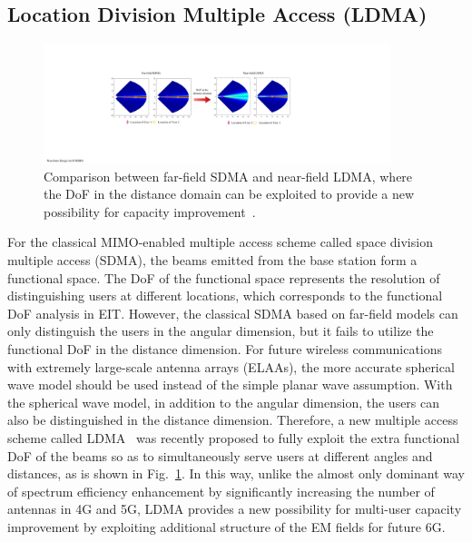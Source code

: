\documentclass[journal,twocolumn]{IEEEtran}
\begin{document}

\subsection{Location Division Multiple Access (LDMA)}
\begin{figure}[t]
	\centering 
	\includegraphics[width=0.9\textwidth]{figures/LDMA.pdf} 
	\caption{Comparison between far-field SDMA and near-field LDMA, where the DoF in the distance domain can be exploited to provide a new possibility for capacity improvement~\cite{wu2022multiple}. }
	\label{fig:LDMA}
\end{figure}

For the classical MIMO-enabled multiple access scheme called space division multiple access (SDMA), the beams emitted from the base station form a functional space. 
The DoF of the functional space represents the resolution of distinguishing users at different locations, which corresponds to the functional DoF analysis in EIT. 	%
However, the classical SDMA based on far-field models can only distinguish the users in the angular dimension, but it fails to utilize the functional DoF in the distance dimension. 
For future wireless communications with extremely large-scale antenna arrays (ELAAs), the more accurate spherical wave model should be used instead of the simple planar wave assumption. 
With the spherical wave model, in addition to the angular dimension, the users can also be distinguished in the distance dimension. 
Therefore, a new multiple access scheme called LDMA~\cite{wu2022multiple} was recently proposed to fully exploit the extra functional DoF of the beams so as to simultaneously serve users at different angles and distances, as is shown in Fig.~\ref{fig:LDMA}. 
In this way, unlike the almost only dominant way of spectrum efficiency enhancement by significantly increasing the number of antennas in 4G and 5G, LDMA provides a new possibility for multi-user capacity improvement by exploiting additional structure of the EM fields for future 6G.   
\end{document}
